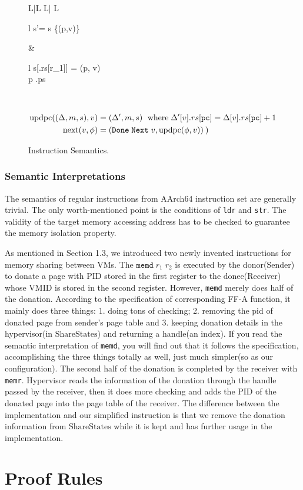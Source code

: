 \documentclass[a4paper]{article}
\newcommand*{\SSS}{\text{ShareStates}}
\newcommand*{\PID}{\text{PID}}
\newcommand*{\VMID}{\text{VMID}}
\newcommand*{\instr}[1]{\texttt{#1}}
\newcommand*{\updpc}{\text{updpc}}
\begin{document}
\begin{figure}[h!]
\begin{adjustwidth}{-1cm}{}
\begin{tabular}[t]{L|L L| L}
\begin{array}{l}
                                      s'= s \setminus \{(p,v)\}
                                    \end{array}
                       &\leftshift\begin{array}{l}
                                       s[\Delta[v].rs[r_{1}]] = (p, v)\\
                                       \land p \notin \Delta[v].ps
                        \end{array} \\\hline
  \end{tabular}
  \end{adjustwidth}
\begin{align*}
  \updpc((\Delta,m,s),v)&=(\Delta',m,s)\ \; \text{where}\; \Delta'[v].rs[\mathtt{pc}] = \Delta[v].rs[\mathtt{pc}]+1\\
     \nextt(v,\phi) &= \DNXT{v}{\phi}
\end{align*}
\caption{Instruction Semantics.}
\end{figure}
\subsubsection{Semantic Interpretations}
The semantics of regular instructions from AArch64 instruction set are generally
trivial. The only worth-mentioned point is the conditions of \instr{ldr} and
\instr{str}. The validity of the target memory accessing address has to be
checked to guarantee the memory isolation property.

As mentioned in Section 1.3, we introduced two newly invented instructions for
memory sharing between VMs. The $\instr{memd}\; r_{1}\; r_{2}$ is executed by
the donor(Sender) to donate a page with $\PID$ stored in the first register to
the donee(Receiver) whose $\VMID$ is stored in the second register. However,
\instr{memd} merely does half of the donation. According to the specification of
corresponding FF-A function, it mainly does three things: 1. doing tons of
checking; 2. removing the pid of donated page from sender's page table and 3.
keeping donation details in the hypervisor(in $\SSS$) and returning a handle(an
index). If you read the semantic interpretation of \instr{memd}, you will find
out that it follows the specification, accomplishing the three things totally as
well, just much simpler(so as our configuration). The second half of the
donation is completed by the receiver with \instr{memr}. Hypervisor reads the
information of the donation through the handle passed by the receiver, then it
does more checking and adds the $\PID$ of the donated page into the page table
of the receiver. The difference between the implementation and our simplified
instruction is that we remove the donation information from $\SSS$ while it is
kept and has further usage in the implementation.

\section{Proof Rules}
\end{document}
